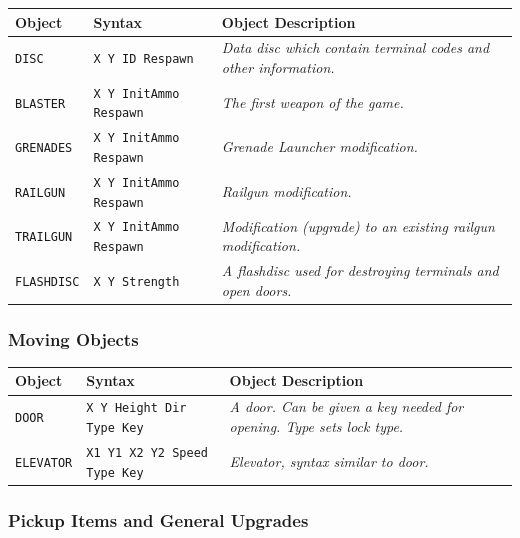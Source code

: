 \documentclass[a5paper, 10pt, titlepage, landscape, twoside, final]{article}
\begin{document}
\begin{table}[ht]
  \small
  \begin{tabular}{lll}
    \textbf{Object} & \textbf{Syntax} & \textbf{Object Description}\\
    \hline
    \hline
    \texttt{DISC} & \texttt{X Y ID Respawn} & \textit{Data disc which contain terminal codes and other information.} \\
    \texttt{BLASTER} & \texttt{X Y InitAmmo Respawn} & \textit{The first weapon of the game.} \\
    \texttt{GRENADES} & \texttt{X Y InitAmmo Respawn} & \textit{Grenade Launcher modification.} \\
    \texttt{RAILGUN} & \texttt{X Y InitAmmo Respawn} & \textit{Railgun modification.} \\
    \texttt{TRAILGUN} & \texttt{X Y InitAmmo Respawn} & \textit{Modification (upgrade) to an existing railgun modification.} \\
    \texttt{FLASHDISC} & \texttt{X Y Strength} & \textit{A flashdisc used for destroying terminals and open doors.} \\
  \end{tabular}
\end{table}

\subsubsection{Moving Objects}

\begin{table}[ht]
  \small
  \begin{tabular}{lll}
    \textbf{Object} & \textbf{Syntax} & \textbf{Object Description}\\
    \hline
    \hline
    \texttt{DOOR} & \texttt{X Y Height Dir Type Key} & \textit{A door. Can be given a key needed for opening. Type sets lock type.} \\
    \texttt{ELEVATOR} & \texttt{X1 Y1 X2 Y2 Speed Type Key} & \textit{Elevator, syntax similar to door.} \\
  \end{tabular}
\end{table}

\clearpage
\subsubsection{Pickup Items and General Upgrades}
\end{document}

